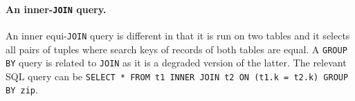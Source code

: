 		\paragraph*{An inner-\texttt{JOIN} query.}
			An inner equi-\texttt{JOIN} query is different in that it is run on two tables and it selects all pairs of tuples where search keys of records of both tables are equal.
			A \texttt{GROUP BY} query is related to \texttt{JOIN} as it is a degraded version of the latter.
			The relevant SQL query can be \texttt{SELECT * FROM t1 INNER JOIN t2 ON (t1.k = t2.k) GROUP BY zip}.
